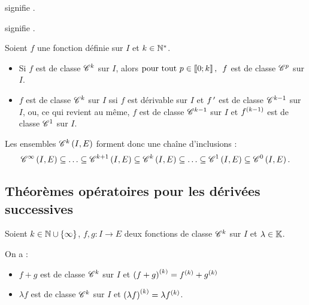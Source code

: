 \begin{rem}
 signifie .

 signifie .
\end{rem}

\begin{prop}
Soient \(f\) une fonction définie sur \(I\) et \(k\in\mathbb{N}^*\).

\begin{itemize}
    \item Si \(f\) est de classe \(\mathscr{C}^{k}\) sur \(I\), alors \(\quantifs{\tpt p\in\interventierii{0}{k}}f\) est de classe \(\mathscr{C}^{p}\) sur \(I\). \\
    \item \(f\) est de classe \(\mathscr{C}^{k}\) sur \(I\) ssi \(f\) est dérivable sur \(I\) et \(f^{\,\prime}\) est de classe \(\mathscr{C}^{k-1}\) sur \(I\), ou, ce qui revient au même, \(f\) est de classe \(\mathscr{C}^{k-1}\) sur \(I\) et \(f^{\left(k-1\right)}\) est de classe \(\mathscr{C}^{1}\) sur \(I\).
\end{itemize}
\end{prop}

Les ensembles \(\mathscr{C}^{k}\left(I,E\right)\) forment donc une chaîne d'inclusions : \[\ensclasse{\infty}{I}{E}\subset\dots\subset\ensclasse{k+1}{I}{E}\subset\ensclasse{k}{I}{E}\subset\dots\subset\ensclasse{1}{I}{E}\subset\ensclasse{0}{I}{E}.\]

\subsection{Théorèmes opératoires pour les dérivées successives}

\begin{prop}
Soient \(k\in\mathbb{N}\cup\left\lbrace\infty\right\rbrace\), \(f,g:I\to E\) deux fonctions de classe \(\mathscr{C}^{k}\) sur \(I\) et \(\lambda\in\mathbb{K}\).

On a :

\begin{itemize}
    \item \(f+g\) est de classe \(\mathscr{C}^{k}\) sur \(I\) et \(\left(f+g\right)^{\left(k\right)}=f^{\left(k\right)}+g^{\left(k\right)}\) \\
    \item \(\lambda f\) est de classe \(\mathscr{C}^{k}\) sur \(I\) et \(\left(\lambda f\right)^{\left(k\right)}=\lambda f^{\left(k\right)}\).
\end{itemize}
\end{prop}

